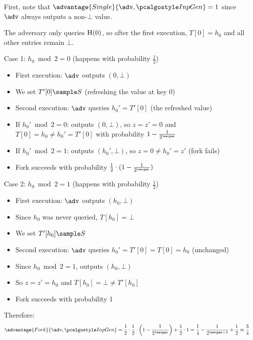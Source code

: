 \ifsolutions
\begin{mysolution}
  First, note that $\advantage{Single}{\adv, \algo{InpGen}} = 1$ since $\adv$ always outputs a non-$\bot$ value. 
  
  The adversary only queries ${\normalfont\textsc{H}}(0)$, so after the first execution, $T[0] = h_0$ and all other entries remain $\bot$.
  
  Case 1: $h_0 \bmod 2 = 0$ (happens with probability $\frac{1}{2}$)
  \begin{itemize}
    \item First execution: $\adv$ outputs $(0, \bot)$
    \item We set $T'[0] \sample S$ (refreshing the value at key 0)
    \item Second execution: $\adv$ queries $h_0' = T'[0]$ (the refreshed value)
    \item If $h_0' \bmod 2 = 0$: outputs $(0, \bot)$, so $z = z' = 0$ and $T[0] = h_0 \neq h_0' = T'[0]$ with probability $1 - \frac{1}{2^\secpar}$
    \item If $h_0' \bmod 2 = 1$: outputs $(h_0', \bot)$, so $z = 0 \neq h_0' = z'$ (fork fails)
    \item Fork succeeds with probability $\frac{1}{2} \cdot (1 - \frac{1}{2^\secpar})$
  \end{itemize}
  
  Case 2: $h_0 \bmod 2 = 1$ (happens with probability $\frac{1}{2}$)
  \begin{itemize}
    \item First execution: $\adv$ outputs $(h_0, \bot)$
    \item Since $h_0$ was never queried, $T[h_0] = \bot$
    \item We set $T'[h_0] \sample S$
    \item Second execution: $\adv$ queries $h_0' = T'[0] = T[0] = h_0$ (unchanged)
    \item Since $h_0 \bmod 2 = 1$, outputs $(h_0, \bot)$
    \item So $z = z' = h_0$ and $T[h_0] = \bot \neq T'[h_0]$
    \item Fork succeeds with probability 1
  \end{itemize}
  
  Therefore:
  \[
  \advantage{Fork}{\adv, \algo{InpGen}} = \frac{1}{2} \cdot \frac{1}{2} \cdot \left(1 - \frac{1}{2^\secpar}\right) + \frac{1}{2} \cdot 1 = \frac{1}{4} - \frac{1}{2^{\secpar+2}} + \frac{1}{2} \approx \frac{3}{4}
  \]
\end{mysolution}
\fi

